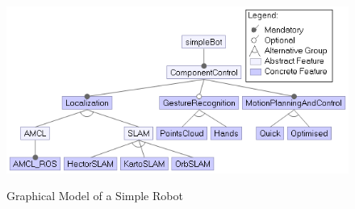 \documentclass{article}
\begin{document}
\begin{figure}[H]
	\caption{Graphical Model of a Simple Robot}
	\centering
	\includegraphics[width=\columnwidth]{images/simpleBot.png}
	\label{simplebot}
\end{figure}
\end{document}
